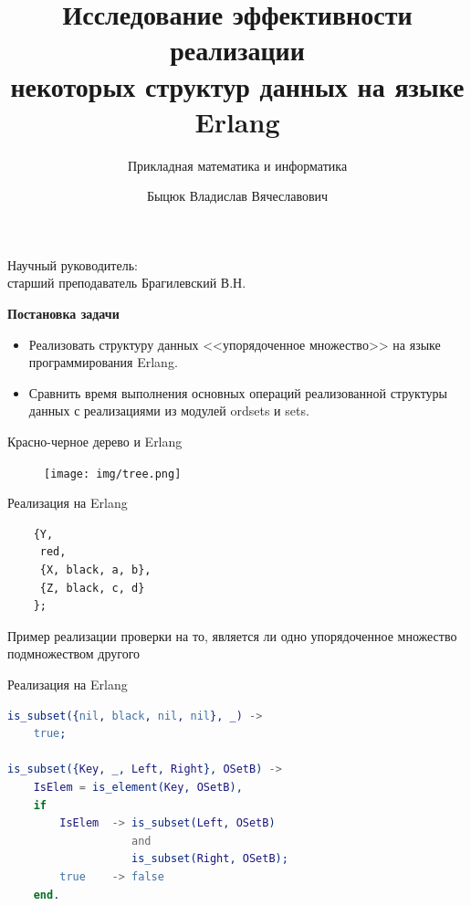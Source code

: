 \documentclass{beamer}
\title[]{Исследование эффективности реализации\\некоторых структур данных на языке Erlang}
\subtitle[ПМИ]{Прикладная математика и информатика}
\author[Быцюк В.В.]{Быцюк Владислав Вячеславович}
\date[]{}
\begin{document}

	\begin{frame}
		\titlepage
		\begin{center}
			Научный руководитель:\\старший преподаватель Брагилевский В.Н.
		\end{center}
	\end{frame}

	\begin{frame}{\LARGE \textbf{Постановка задачи}}
		\begin{itemize}
			\item Реализовать структуру данных <<упорядоченное множество>> на языке программирования Erlang.
			\item Сравнить время выполнения основных операций реализованной структуры данных с реализациями из модулей
			  	  ordsets и sets. 
		\end{itemize}
	\end{frame}
	
	

	\begin{frame}[fragile]{Красно-черное дерево и Erlang}
		\begin{figure}
			\texttt{[image: img/tree.png]}
		\end{figure}
		
		\begin{block}{Реализация на Erlang}
																																																												\begin{lstlisting}  
	{Y, 
	 red, 
	 {X, black, a, b}, 
	 {Z, black, c, d}
	};		   
			\end{lstlisting}
		\end{block}	
	\end{frame}
	
	\begin{frame}[fragile]{Пример реализации проверки на то, является ли одно упорядоченное множество подмножеством другого}
		\begin{block}{Реализация на Erlang}
			\begin{lstlisting}[language = erlang] 	
is_subset({nil, black, nil, nil}, _) ->
    true;	
	
is_subset({Key, _, Left, Right}, OSetB) ->
    IsElem = is_element(Key, OSetB),
    if
        IsElem  -> is_subset(Left, OSetB) 
                   and 
                   is_subset(Right, OSetB);
        true    -> false
    end.
			\end{lstlisting}
		\end{block}	
	\end{frame}
	
\end{document}
